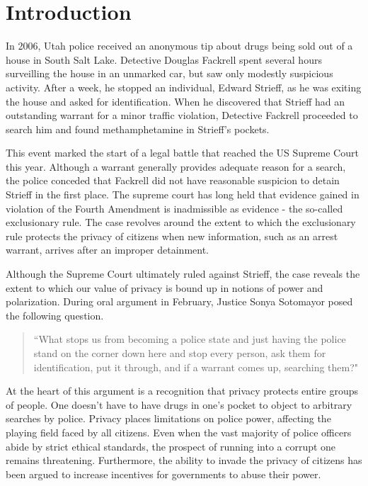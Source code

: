 %

\section{Introduction}
\label{sec:intro}




In 2006, Utah police received an anonymous tip about drugs being sold out of a house in South Salt Lake. Detective Douglas Fackrell spent several hours surveilling the house in an unmarked car, but saw only modestly suspicious activity.  After a week, he stopped an individual, Edward Strieff, as he was exiting the house and asked for identification.  When he discovered that Strieff had an outstanding warrant for a minor traffic violation, Detective Fackrell proceeded to search him and found methamphetamine in Strieff's pockets.  

This event marked the start of a legal battle that reached the US Supreme Court this year.  Although a warrant generally provides adequate reason for a search, the police conceded that Fackrell did not have reasonable suspicion to detain Strieff in the first place.  The supreme court has long held that evidence gained in violation of the Fourth Amendment is inadmissible as evidence - the so-called exclusionary rule.  The case revolves around the extent to which the exclusionary rule protects the privacy of citizens when new information, such as an arrest warrant, arrives after an improper detainment.

Although the Supreme Court ultimately ruled against Strieff, the case reveals the extent to which our value of privacy is bound up in notions of power and polarization.  During oral argument in February, Justice Sonya Sotomayor posed the following question. 

\begin{quote}``What stops us from becoming a police state and just having the police stand on the corner down here and stop every person, ask them for identification, put it through, and if a warrant comes up, searching them?"
\end{quote}

At the heart of this argument is a recognition that privacy protects entire groups of people.  One doesn't have to have drugs in one's pocket to object to arbitrary searches by police.  Privacy places limitations on police power, affecting the playing field faced by all citizens.  Even when the vast majority of police officers abide by strict ethical standards, the prospect of running into a corrupt one remains threatening.  Furthermore, the ability to invade the privacy of citizens has been argued to increase incentives for governments to abuse their power.~\cite{laskowskigovernment}

